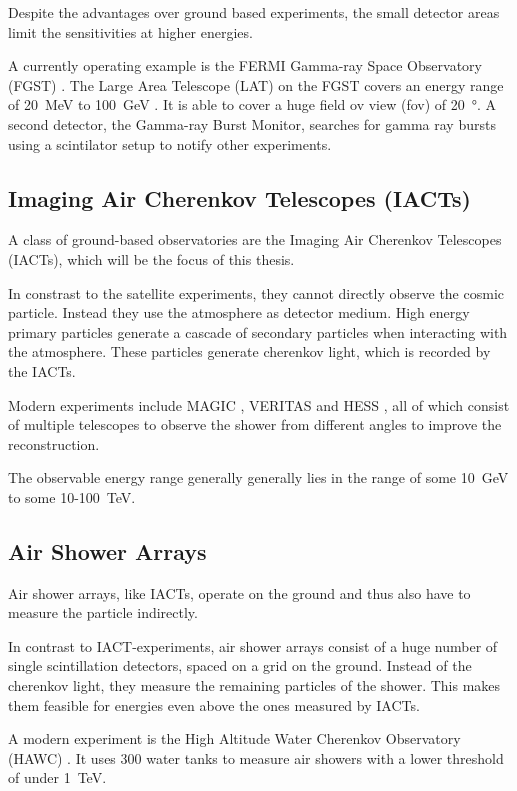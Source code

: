 Despite the advantages over ground based experiments, the small detector areas 
limit the sensitivities at higher energies.

A currently operating example is the FERMI Gamma-ray Space Observatory (FGST) \cite{Atwood_2009}.
The Large Area Telescope (LAT) on 
the FGST covers an energy range of
\SI{20}{\mega\electronvolt} to \SI{100}{\giga\electronvolt} \cite{Atwood_2009}.
It is able to cover a huge field ov view (fov) of 
\SI{20}{\degree}. A second detector, the Gamma-ray Burst Monitor,
searches for gamma ray bursts using a scintilator setup to notify other experiments.

\subsection{Imaging Air Cherenkov Telescopes (IACTs)}
A class of ground-based observatories are the 
Imaging Air Cherenkov Telescopes (IACTs),
which will be the focus of this thesis.

In constrast to the satellite experiments, they cannot directly
observe the cosmic particle. Instead they use the atmosphere as detector medium.
High energy primary particles generate a cascade of secondary particles
when interacting with the atmosphere. These particles generate cherenkov
light, which is recorded by the IACTs.

Modern experiments include 
MAGIC \cite{ALEKSIC2012435},
VERITAS \cite{WEEKES2002221}
and HESS \cite{vincent2005hess},
all of which consist of multiple telescopes to observe the shower 
from different angles to improve the reconstruction.

The observable energy range generally generally lies in the range of
some \SI{10}{\giga\electronvolt} to some 10-\SI{100}{\tera\electronvolt}.

\subsection{Air Shower Arrays}
Air shower arrays, like IACTs, operate on the ground and thus also have 
to measure the particle indirectly.

In contrast to IACT-experiments, air shower arrays consist of a huge
number of single scintillation detectors, spaced on a grid on the ground.
Instead of the cherenkov light, they measure the
remaining particles of the shower. This makes them feasible
for energies even above the ones measured by IACTs.

A modern experiment is the High Altitude Water Cherenkov Observatory (HAWC) \cite{2015ICRC...34..966S}.
It uses \num{300} water tanks to measure air showers with a lower threshold
of under \SI{1}{\tera\electronvolt}.

